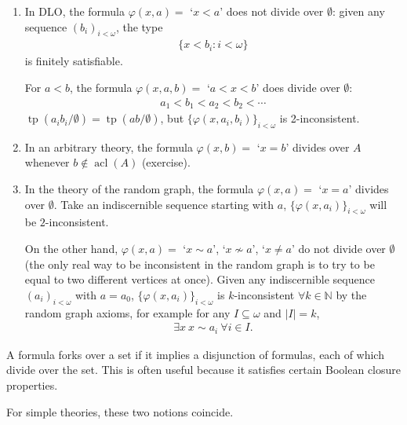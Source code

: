 \documentclass{article}
\DeclareMathOperator{\tp}{tp}
\DeclareMathOperator{\acl}{acl}
\begin{document}
\begin{eg}\leavevmode
  \begin{enumerate}
    \item In DLO, the formula $\varphi(x,a) =$ `$x<a$'
      does not divide over $\emptyset$: given any sequence $(b_i)_{i < \omega}$, the type
      \begin{align*}
        \{x < b_i : i < \omega\}
      \end{align*}
      is finitely satisfiable.

      For $a < b$, the formula $\varphi(x,a,b)=$ `$a < x < b$' does divide over $\emptyset$:
      \begin{align*}
        a_1 < b_1 < a_2 < b_2 < \dotsb
      \end{align*}
      $\tp(a_i b_i / \emptyset) = \tp(ab/\emptyset)$, but $\{\varphi(x,a_i,b_i)\}_{i < \omega}$ is 2-inconsistent.
    \item In an arbitrary theory, the formula $\varphi(x,b) = $ `$x = b$' divides over $A$ whenever $b \notin \acl(A)$ (exercise).
    \item In the theory of the random graph, the formula $\varphi(x,a) =$ `$x=a$' divides over $\emptyset$.
      Take an indiscernible sequence starting with $a$, $\{\varphi(x,a_i)\}_{i < \omega}$ will be $2$-inconsistent.

      On the other hand, $\varphi(x,a) =$ `$x \sim a$', `$x \nsim a$', `$x \neq a$' do not divide over $\emptyset$ (the only real way to be inconsistent in the random graph is to try to be equal to two different vertices at once).
      Given any indiscernible sequence $(a_i)_{i < \omega}$ with $a = a_0$, $\{\varphi(x,a_i)\}_{i < \omega}$ is $k$-inconsistent $\forall k \in \mathbb{N}$ by the random graph axioms, for example for any $I \subseteq \omega$ and $|I| = k$,
      \begin{align*}
        \exists x \ x \sim a_i \ \forall i \in I.
      \end{align*}
  \end{enumerate}
\end{eg}
A formula forks over a set if it implies a disjunction of formulas, each of which divide over the set.
This is often useful because it satisfies certain Boolean closure properties.

For simple theories, these two notions coincide.
\end{document}
